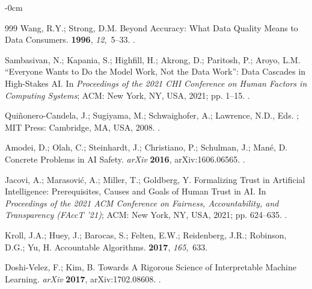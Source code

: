 \documentclass[systems,article,accept,moreauthors,pdftex]{Definitions/mdpi}
\begin{document}
\begin{adjustwidth}{-\extralength}{0cm}
\begin{thebibliography}{999}
Wang, R.Y.; Strong, D.M.
\newblock Beyond Accuracy: What Data Quality Means to Data Consumers.
 {\bf 1996}, {\em
  12},~5--33.
.

Sambasivan, N.; Kapania, S.; Highfill, H.; Akrong, D.; Paritosh, P.; Aroyo,
  L.M.
\newblock ``Everyone Wants to Do the Model Work, Not the Data Work'': Data
  Cascades in High-Stakes {AI}.
\newblock In \emph{Proceedings of the 2021 CHI Conference on Human
  Factors in Computing Systems}; ACM: New York, NY, USA, 2021; pp. 1--15.
.

Qui{\~n}onero-Candela, J.; Sugiyama, M.; Schwaighofer, A.; Lawrence, N.D., Eds.
; MIT Press: Cambridge, MA,
  USA,  2008.
.

Amodei, D.; Olah, C.; Steinhardt, J.; Christiano, P.; Schulman, J.; Man{\'e},
  D.
\newblock Concrete Problems in {AI} Safety.
\newblock \emph{arXiv} \textbf{2016}, arXiv:1606.06565.
.

Jacovi, A.; Marasovi{\'c}, A.; Miller, T.; Goldberg, Y.
\newblock Formalizing Trust in Artificial Intelligence: Prerequisites, Causes
  and Goals of Human Trust in {AI}.
\newblock In \emph{Proceedings of the 2021 ACM Conference on
  Fairness, Accountability, and Transparency (FAccT '21)};  ACM: New York, NY, USA, 2021; pp. 624--635.
.

Kroll, J.A.; Huey, J.; Barocas, S.; Felten, E.W.; Reidenberg, J.R.; Robinson,
  D.G.; Yu, H.
\newblock Accountable Algorithms.
 {\bf 2017}, {\em
  165},~633.

Doshi-Velez, F.; Kim, B.
\newblock Towards A Rigorous Science of Interpretable Machine Learning.
\newblock \emph{arXiv} \textbf{2017}, arXiv:1702.08608.
.


\end{thebibliography}
\end{adjustwidth}
\end{document}
